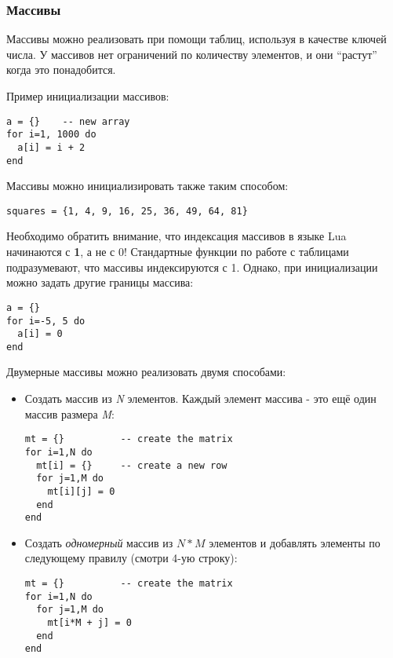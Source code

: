 \subsubsection{Массивы}

Массивы можно реализовать при помощи таблиц, используя в качестве ключей числа. 
У массивов нет ограничений по количеству элементов, и они ``растут'' когда это понадобится.

Пример инициализации массивов:

\begin{lstlisting}
a = {}    -- new array
for i=1, 1000 do
  a[i] = i + 2 
end
\end{lstlisting}

Массивы можно инициализировать также таким способом:

\begin{lstlisting}
squares = {1, 4, 9, 16, 25, 36, 49, 64, 81}
\end{lstlisting}

Необходимо обратить внимание, что индексация массивов в языке Lua начинаются с \textbf{1}, а не с 0!
Стандартные функции по работе с таблицами подразумевают, что массивы индексируются с 1.
Однако, при инициализации можно задать другие границы массива:

\begin{lstlisting}
a = {}
for i=-5, 5 do
  a[i] = 0
end 
\end{lstlisting}

Двумерные массивы можно реализовать двумя способами:

\begin{itemize}
	\item Создать массив из \emph{N} элементов. Каждый элемент массива - это ещё один массив размера \emph{M}:
	
\begin{lstlisting}
mt = {}          -- create the matrix
for i=1,N do
  mt[i] = {}     -- create a new row
  for j=1,M do
    mt[i][j] = 0
  end
end
\end{lstlisting}

	\item Создать \emph{одномерный} массив из $N * M$ элементов и добавлять элементы по следующему правилу (смотри 4-ую строку):

\begin{lstlisting}
mt = {}          -- create the matrix
for i=1,N do
  for j=1,M do
    mt[i*M + j] = 0
  end
end
\end{lstlisting}
	
\end{itemize}

